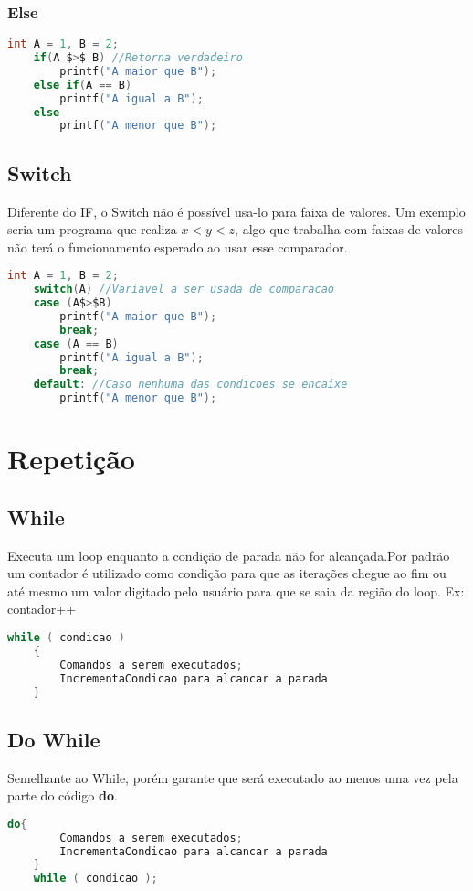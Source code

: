 \documentclass[12pt]{article}
\begin{document}
\subsubsection{Else}
\begin{lstlisting}[language=C,mathescape=true]
	int A = 1, B = 2;
	if(A $>$ B) //Retorna verdadeiro
		printf("A maior que B");
	else if(A == B)
		printf("A igual a B");
	else
		printf("A menor que B");
\end{lstlisting}
\subsection{Switch}
Diferente do IF, o Switch não é possível usa-lo para faixa de valores. Um exemplo seria um programa que realiza $x < y < z$, algo que trabalha com faixas de valores não terá o funcionamento esperado ao usar esse comparador.
\begin{lstlisting}[language=C,mathescape=true]
	int A = 1, B = 2;
	switch(A) //Variavel a ser usada de comparacao
	case (A$>$B)
		printf("A maior que B");
		break;
	case (A == B)
		printf("A igual a B");
		break;
	default: //Caso nenhuma das condicoes se encaixe
		printf("A menor que B");
\end{lstlisting}

\section{Repetição}
\subsection{While}\label{while}
Executa um loop enquanto a condição de parada não for alcançada.Por padrão um contador é utilizado como condição para que as iterações chegue ao fim ou até mesmo um valor digitado pelo usuário para que se saia da região do loop. Ex: contador++
\begin{lstlisting}[language=C,mathescape=true]
	while ( condicao ) 
	{ 
		Comandos a serem executados; 
		IncrementaCondicao para alcancar a parada
	}  
\end{lstlisting}

\subsection{Do While}
Semelhante ao While, porém garante que será executado ao menos uma vez pela parte do código \textbf{do}.
\begin{lstlisting}[language=C,mathescape=true]
	do{
		Comandos a serem executados;
		IncrementaCondicao para alcancar a parada
	}
	while ( condicao ); 
\end{lstlisting}
\end{document}
